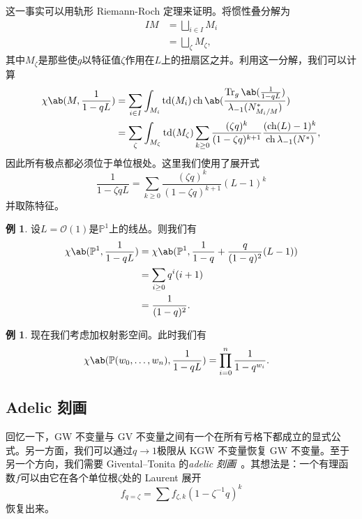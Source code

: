 \documentclass{amsart}
\theoremstyle{definition}
\newtheorem{exm}[thm]{例}
\theoremstyle{remark}
\theoremstyle{plain}
\theoremstyle{definition}
\theoremstyle{remark}
\renewcommand{\P}{\mathbb{P}}
\newcommand{\mc}[1]{\mathcal{#1}}
\newcommand{\on}[1]{\operatorname{#1}}
\newcommand{\1}{\mathbf{1}}
\newcommand{\2}{\mathbf{2}}
\newcommand{\3}{\mathbf{3}}
\DeclareMathOperator{\ch}{ch}
\begin{document}
这一事实可以用轨形 Riemann-Roch 定理来证明。将惯性叠分解为
\begin{align*}
    IM &= \bigsqcup_{i \in I} M_i \\
    &= \bigsqcup_{\zeta} M_{\zeta},
\end{align*}
其中\(M_{\zeta}\)是那些使\(g\)以特征值\(\zeta\)作用在\(L\)上的扭扇区之并。利用这一分解，我们可以计算
\begin{align*}
    \chi\ab(M, \frac{1}{1-qL}) &= \sum_{i \in I} \int_{M_i} \on{td}(M_i) \on{ch} \ab(\frac{ \on{Tr}_g \ab(\frac{1}{1-qL}) }{\lambda_{-1}(N_{M_i/M}^*)}) \\
    &= \sum_{\zeta} \int_{M_{\zeta}} \on{td}(M_{\zeta}) \sum_{k \geq 0} \frac{(\zeta q)^k}{(1-\zeta q)^{k+1}} \frac{( \on{ch}(L)-1 )^k}{\ch \lambda_{-1}(N^*)},
\end{align*}
因此所有极点都必须位于单位根处。这里我们使用了展开式
\[ \frac{1}{1-\zeta q L} = \sum_{k \geq 0} \frac{(\zeta q)^k}{(1-\zeta q)^{k+1}} (L-1)^k \]
并取陈特征。

\begin{exm}
    设\(L = \mc{O}(1)\)是\(\P^1\)上的线丛。则我们有
    \begin{align*}
        \chi\ab(\P^1, \frac{1}{1-qL}) &= \chi\ab(\P^1, \frac{1}{1-q} + \frac{q}{(1-q)^2}(L-1)) \\
        &= \sum_{i \geq 0} q^i (i+1) \\
        &= \frac{1}{(1-q)^2}.
    \end{align*}
\end{exm}

\begin{exm}
    现在我们考虑加权射影空间。此时我们有
    \begin{align*}
        \chi\ab(\P(w_0, \ldots, w_n), \frac{1}{1-qL}) &= \prod_{i=0}^n \frac{1}{1-q^{w_i}}. 
    \end{align*}
\end{exm}

\subsection{Adelic 刻画}%
\label{sub:Adelic characterization}

回忆一下，GW 不变量与 GV 不变量之间有一个在所有亏格下都成立的显式公式。另一方面，我们可以通过\(q \to 1\)极限从 KGW 不变量恢复 GW 不变量。至于另一个方向，我们需要 Givental--Tonita 的\textit{adelic 刻画}~\cite{GiventalTonita2014}。其想法是：一个有理函数\(f\)可以由它在各个单位根\(\zeta\)处的 Laurent 展开
\[ f_{q=\zeta} = \sum f_{\zeta, k} (1-\zeta^{-1} q)^k \]
恢复出来。
\end{document}
